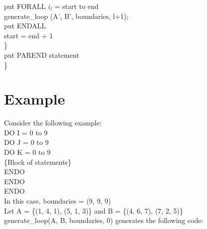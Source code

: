 \indent\indent		put FORALL $i_l$ = start to end \\
\indent\indent		generate\_loop (A', B', boundaries, l+1); \\
\indent\indent		put ENDALL \\

\indent\indent		start = end + 1 \\
\indent	\} \\
\indent put PAREND statement\\
\} \\	

\section{Example}

Consider the following example: \\
DO I = 0 to 9 \\
\indent DO J = 0 to 9 \\
\indent \indent DO K = 0 to 9 \\
\indent \indent \indent \{Block of statements\} \\
\indent \indent ENDO \\
\indent ENDO \\
ENDO \\

\noindent In this case, boundaries = (9, 9, 9) \\
Let A = \{(1, 4, 1), (5, 1, 3)\} and B = \{(4, 6, 7), (7, 2, 5)\} \\

\noindent generate\_loop(A, B, boundaries, 0) generates the following code: \\

